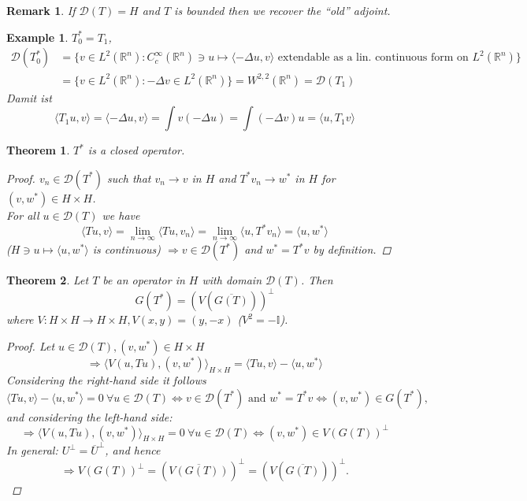 \documentclass[12pt]{extreport} %
\newcommand{\R}{\mathbb{R}}
\newcommand{\DO}[1]{\mathcal{D}\left( {#1} \right)}
\theoremstyle{named}
\theoremstyle{nnamed}
\theoremstyle{itshape}
\newtheorem{theorem}{Theorem}  \counterwithin{theorem}{chapter}
\theoremstyle{normal}
\newtheorem*{example}{Example}
\newtheorem*{remark}{Remark}
\begin{document}
\begin{remark}
	If $\DO{T} = H$ and $T$ is bounded then we recover the \enquote{old} adjoint.
\end{remark}

\begin{example}
	$T_0^* = T_1$, 
	\begin{align*}
		\DO{T_0^*} & = \big\{ v \in L^2(\R^n) \colon C_c^\infty(\R^n) \ni u \mapsto \langle - \Delta u, v \rangle \text{ extendable as a lin. continuous form on } L^2(\R^n) \big\} \\
			& = \big\{ v \in L^2(\R^n) \colon - \Delta v \in L^2(\R^n) \big\} = W^{2,2}(\R^n) = \DO{T_1}
	\end{align*}
	Damit ist
	$$ \langle T_1 u, v \rangle = \langle - \Delta u, v \rangle = \int v \left( - \Delta u \right) = \int \left( - \Delta v \right) u = \langle u, T_1 v \rangle $$
\end{example}

\begin{theorem} \label{I.1:thm}
	$T^*$ is a closed operator.
	
	\begin{proof}
		$v_n \in \DO{T^*}$ such that $v_n \rightarrow v$ in $H$ and $T^* v_n \rightarrow w^*$ in $H$ for $(v, w^*) \in H \times H$. ~\\
		For all $u \in \DO{T}$ we have
			$$ \langle Tu, v \rangle = \lim_{n \rightarrow \infty} \langle T u, v_n \rangle = \lim_{n \rightarrow \infty} \langle u, T^* v_n \rangle = \langle u , w^* \rangle $$
		($H \ni u \mapsto \langle u, w^* \rangle$ is continuous) $\Rightarrow v \in \DO{T^*}$ and $w^* = T^* v$ by definition.
	\end{proof}
\end{theorem}

\begin{theorem} \label{I.2:thm}
	Let $T$ be an operator in $H$ with domain $\DO{T}$. Then
		$$ G \left( T^* \right) = \left( V \left( \overline{G(T)} \right) \right)^{\perp} $$
	where $V \colon H \times H \rightarrow H \times H, V(x, y) = (y, -x)$ ($V^2 = - \mathbb{I}$).
	
	\begin{proof}
		Let $u \in \DO{T}, \left(v, w^* \right) \in H \times H$ 
			$$ \Rightarrow \langle V \left( u, Tu \right), \left( v, w^* \right) \rangle_{H \times H} = \langle T u, v \rangle - \langle u, w^* \rangle $$
		Considering the right-hand side it follows
		$$ \langle T u, v \rangle - \langle u, w^* \rangle = 0 ~ \forall u \in \DO{T} \iff v \in \DO{T^*} \text{ and } w^* = T^* v \iff \left( v, w^* \right) \in G\left( T^* \right), $$
		and considering the left-hand side:
		$$ \Rightarrow \langle V \left( u, Tu \right), \left( v, w^* \right) \rangle_{H \times H} = 0 ~ \forall u \in \DO{T} \iff \left( v, w^* \right) \in V \left( G(T) \right)^{\perp} $$
		In general: $U^{\perp} = \overline{U}^{\perp}$, and hence
		$$ \Rightarrow V \left( G(T) \right)^{\perp} = \left( \overline{V\left( G(T) \right)} \right)^{\perp} = \left( V \left( \overline{G(T)} \right) \right)^{\perp}. $$
	\end{proof}
\end{theorem}
\end{document}
